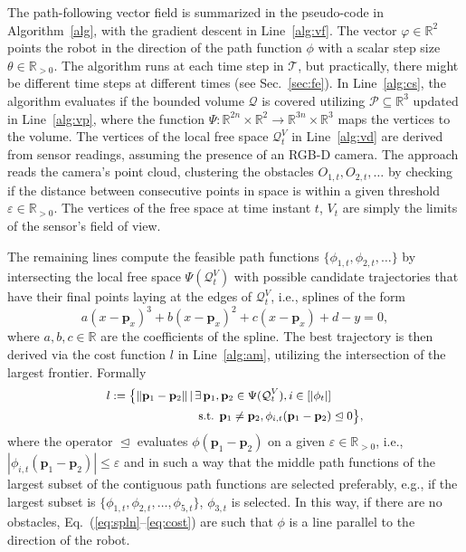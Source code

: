 \documentclass[letterpaper,10pt,conference,twoside]{IEEEtran}
\theoremstyle{definition}
\begin{document}
The path-following vector field is summarized in the pseudo-code in Algorithm~\ref{alg}, with the gradient descent in Line~\ref{alg:vf}. The vector $\varphi\in\mathbb{R}^2$ points the robot in the direction of the path function $\phi$ with a scalar step size $\theta\in\mathbb{R}_{>0}$. The algorithm runs at each time step in $\mathcal{T}$, %
but practically, there might be different time steps at different times (see Sec.~\ref{sec:fe}). 
In Line~\ref{alg:cs}, the algorithm evaluates if the bounded volume $\mathcal{Q}$ is covered utilizing $\mathcal{P}\subseteq\mathbb{R}^3$ updated in Line~\ref{alg:vp}, where the function $\Psi:\mathbb{R}^{2n}\times\mathbb{R}^2\rightarrow\mathbb{R}^{3n}\times\mathbb{R}^3$ maps the vertices to the volume. The vertices of the local free space $\mathcal{Q}^V_t$ in Line~\ref{alg:vd} are derived from sensor readings, assuming the presence of an RGB-D camera. The %
approach reads the camera's point cloud, clustering the obstacles $O_{1,t},O_{2,t},\dots$ by checking if the distance between consecutive points in space is within a given threshold $\varepsilon\in\mathbb{R}_{>0}$. The vertices of the free space at time instant $t$, $V_t$ are simply the limits of the sensor's field of view.

The remaining lines %
compute the feasible path functions $\{\phi_{1,t},\phi_{2,t},\dots\}$ by intersecting the local free space $\Psi(\mathcal{Q}^V_t)$ with possible candidate trajectories that have their final points laying at the edges of $\mathcal{Q}^V_t$, i.e., splines of the form
\begin{equation}\label{eq:spln}
  a(x-\mathbf{p}_x)^3+b(x-\mathbf{p}_x)^2+c(x-\mathbf{p}_x)+d-y=0,
\end{equation}
where $a,b,c\in\mathbb{R}$ are the coefficients of the spline. 
The best trajectory is then derived via the cost function $l$ in Line~\ref{alg:am}, utilizing the intersection of the largest frontier. Formally
\begin{equation}\label{eq:cost}\small\begin{split} 
  l:=\bigl\{\lVert \mathbf{p}_1-\mathbf{p}_2\rVert\,|\,&\exists\,\mathbf{p}_1,\mathbf{p}_2\in\Psi(\mathcal{Q}_t^V),i\in[|\phi_t|]\\
  &\text{ s.t. }\mathbf{p}_1\neq\mathbf{p}_2,\phi_{i,t}(\mathbf{p}_1-\mathbf{p}_2)\trianglelefteq 0\bigr\},
\end{split}\end{equation}
where the operator $\trianglelefteq$ evaluates $\phi(\mathbf{p}_1-\mathbf{p}_2)$ on a given $\varepsilon\in\mathbb{R}_{>0}$, i.e., $|\phi_{i,t}(\mathbf{p}_1-\mathbf{p}_2)|\leq\varepsilon$ and in such a way that the middle path functions of the largest subset of the contiguous path functions are selected preferably, e.g., if the largest subset is $\{\phi_{1,t},\phi_{2,t},\dots,\phi_{5,t}\}$, $\phi_{3,t}$ is selected.
In this way, if there are no obstacles, Eq.~(\ref{eq:spln}--\ref{eq:cost}) are such that $\phi$ is a line parallel to the direction of the robot. 
\end{document}
